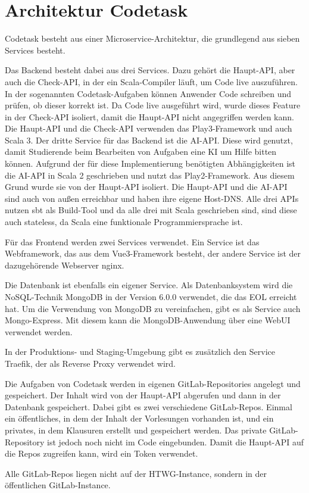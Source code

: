 \section{Architektur Codetask}

Codetask besteht aus einer Microservice-Architektur, die grundlegend aus sieben Services besteht.

Das Backend besteht dabei aus drei Services. Dazu gehört die Haupt-API, aber auch die Check-API, in der ein Scala-Compiler läuft, um Code live auszuführen. In der sogenannten Codetask-Aufgaben können Anwender Code schreiben und prüfen, ob dieser korrekt ist.
Da Code live ausgeführt wird, wurde dieses Feature in der Check-API isoliert, damit die Haupt-API nicht angegriffen werden kann.
Die Haupt-API und die Check-API verwenden das Play3-Framework und auch Scala 3.
Der dritte Service für das Backend ist die AI-API. Diese wird genutzt, damit Studierende beim Bearbeiten von Aufgaben eine KI um Hilfe bitten können.
Aufgrund der für diese Implementierung benötigten Abhängigkeiten ist die AI-API in Scala 2 geschrieben und nutzt das Play2-Framework. Aus diesem Grund wurde sie von der Haupt-API isoliert.
Die Haupt-API und die AI-API sind auch von außen erreichbar und haben ihre eigene Host-DNS.
Alle drei APIs nutzen sbt als Build-Tool und da alle drei mit Scala geschrieben sind, sind diese auch stateless, da Scala eine funktionale Programmiersprache ist.

Für das Frontend werden zwei Services verwendet. Ein Service ist das Webframework, das aus dem Vue3-Framework besteht, der andere Service ist der dazugehörende Webserver nginx.

Die Datenbank ist ebenfalls ein eigener Service. Als Datenbanksystem wird die NoSQL-Technik MongoDB in der Version 6.0.0 verwendet, die das EOL erreicht hat.
Um die Verwendung von MongoDB zu vereinfachen, gibt es als Service auch Mongo-Express. Mit diesem kann die MongoDB-Anwendung über eine WebUI verwendet werden.

In der Produktions- und Staging-Umgebung gibt es zusätzlich den Service Traefik, der als Reverse Proxy verwendet wird.

Die Aufgaben von Codetask werden in eigenen GitLab-Repositories angelegt und gespeichert. Der Inhalt wird von der Haupt-API abgerufen und dann in der Datenbank gespeichert.
Dabei gibt es zwei verschiedene GitLab-Repos. Einmal ein öffentliches, in dem der Inhalt der Vorlesungen vorhanden ist, und ein privates, in dem Klausuren erstellt und gespeichert werden. 
Das private GitLab-Repository ist jedoch noch nicht im Code eingebunden. Damit die Haupt-API auf die Repos zugreifen kann, wird ein Token verwendet.

Alle GitLab-Repos liegen nicht auf der HTWG-Instance, sondern in der öffentlichen GitLab-Instance.